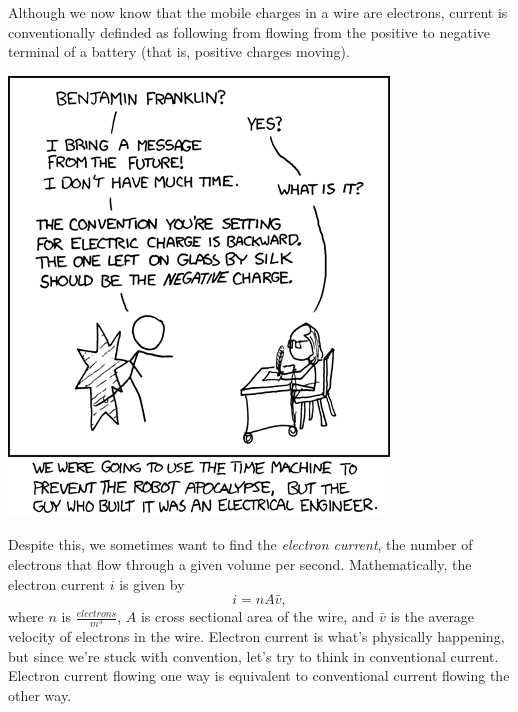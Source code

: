 \documentclass[nobib]{tufte-handout}
\begin{document}
Although we now know that the mobile charges in a wire are electrons, 
current is conventionally definded as following from flowing from 
the positive to negative terminal of a battery (that is, positive charges 
moving). 
\begin{marginfigure}
    \center 
    \includegraphics{images/urgent_mission.png}
\end{marginfigure}
\noindent Despite this, we sometimes want to find the \emph{electron current}, 
the number of electrons that flow through a given volume per second. 
Mathematically, the electron current $i$ is given by  
\[i = nA\bar{v},\]
where $n$ is $\frac{electrons}{m^3}$, $A$ is cross sectional area of the wire, and
$\bar{v}$ is the average velocity of electrons in the wire. 
Electron current is what's physically happening, but since we're stuck 
with convention, let's try to think in conventional current. 
Electron current flowing one way is equivalent to conventional current 
flowing the other way. 
\end{document}
